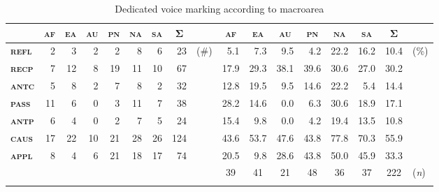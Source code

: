 \begin{table}
	\setlength{\tabcolsep}{2.7pt}
	\begin{tabularx}{\textwidth}{lrrrrrrrlrrrrrrrl}
		\lsptoprule
		& \multicolumn{1}{c}{\textbf{\textsc{af}}} & \multicolumn{1}{c}{\textbf{\textsc{ea}}} & \multicolumn{1}{c}{\textbf{\textsc{au}}} & \multicolumn{1}{c}{\textbf{\textsc{pn}}} & \multicolumn{1}{c}{\textbf{\textsc{na}}} & \multicolumn{1}{c}{\textbf{\textsc{sa}}} & \multicolumn{1}{c}{\textbf{Σ}} & & \multicolumn{1}{c}{\textbf{\textsc{af}}} & \multicolumn{1}{c}{\textbf{\textsc{ea}}} & \multicolumn{1}{c}{\textbf{\textsc{au}}} & \multicolumn{1}{c}{\textbf{\textsc{pn}}} & \multicolumn{1}{c}{\textbf{\textsc{na}}} & \multicolumn{1}{c}{\textbf{\textsc{sa}}} & \multicolumn{1}{c}{\textbf{Σ}} & \\
		\midrule
		\textbf{\textsc{refl}} & 2 & 3 & 2 & 2 & 8 & 6 & 23 & (\#) & 5.1 & 7.3 & 9.5 & 4.2 & 22.2 & 16.2 & 10.4 & (\%) \\
		\textbf{\textsc{recp}} & 7 & 12 & 8 & 19 & 11 & 10 & 67 & & 17.9 & 29.3 & 38.1 & 39.6 & 30.6 & 27.0 & 30.2 & \\
		\textbf{\textsc{antc}} & 5 & 8 & 2 & 7 & 8 & 2 & 32 & & 12.8 & 19.5 & 9.5 & 14.6 & 22.2 & 5.4 & 14.4 & \\
		\textbf{\textsc{pass}} & 11 & 6 & 0 & 3 & 11 & 7 & 38 & & 28.2 & 14.6 & 0.0 & 6.3 & 30.6 & 18.9 & 17.1 & \\
		\textbf{\textsc{antp}} & 6 & 4 & 0 & 2 & 7 & 5 & 24 & & 15.4 & 9.8 & 0.0 & 4.2 & 19.4 & 13.5 & 10.8 & \\
		\textbf{\textsc{caus}} & 17 & 22 & 10 & 21 & 28 & 26 & 124 & & 43.6 & 53.7 & 47.6 & 43.8 & 77.8 & 70.3 & 55.9 & \\
		\textbf{\textsc{appl}} & 8 & 4 & 6 & 21 & 18 & 17 & 74 & & 20.5 & 9.8 & 28.6 & 43.8 & 50.0 & 45.9 & 33.3 & \\
		\midrule
		& & & & & & & & & \multicolumn{1}{c}{39} & \multicolumn{1}{c}{41} & \multicolumn{1}{c}{21} & \multicolumn{1}{c}{48} & \multicolumn{1}{c}{36} & \multicolumn{1}{c}{37} & \multicolumn{1}{c}{222} & (\textit{n}) \\
		\lspbottomrule
	\end{tabularx}
	\caption{Dedicated voice marking according to macroarea}
	\label{tab:ch6:voice-dedicated-1}
\end{table} 

